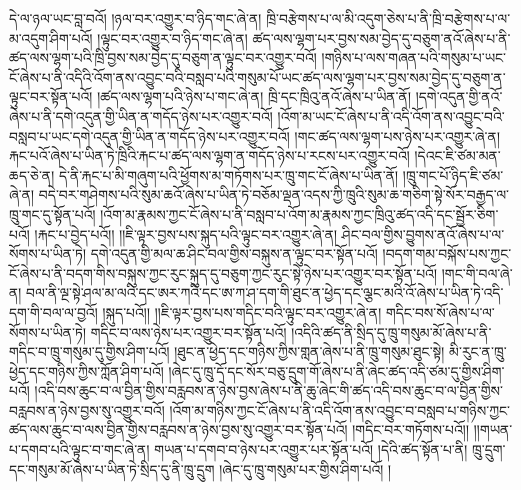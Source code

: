 དེ་ལ་ཉལ་ཡང་བླ་བའོ། །ཉལ་བར་འགྱུར་བ་ཉིད་གང་ཞེ་ན། ཁྲི་བརྩེགས་པ་ལ་མི་འདུག་ཅེས་པ་ནི་ཁྲི་བརྩེགས་པ་ལ་མ་འདུག་ཤིག་པའོ། །ལྟུང་བར་འགྱུར་བ་ཉིད་གང་ཞེ་ན། ཚད་ལས་ལྷག་པར་བྱས་སམ་བྱེད་དུ་བཅུག་ནའོ་ཞེས་པ་ནི་ཚད་ལས་ལྷག་པའི་ཁྲི་བྱས་སམ་བྱེད་དུ་བཅུག་ན་ལྟུང་བར་འགྱུར་བའོ། །གཉིས་པ་ལས་གཞན་པའི་གསུམ་པ་ཡང་ངོ་ཞེས་པ་ནི་འདིའི་འོག་ནས་འབྱུང་བའི་བསླབ་པའི་གསུམ་པོ་ཡང་ཚད་ལས་ལྷག་པར་བྱས་སམ་བྱེད་དུ་བཅུག་ན་ལྟུང་བར་སྟོན་པའོ། །ཚད་ལས་ལྷག་པའི་ཉེས་པ་གང་ཞེ་ན། ཁྲི་དང་ཁྲིའུ་ནའོ་ཞེས་པ་ཡིན་ནོ། །དགེ་འདུན་གྱི་ནའོ་ཞེས་པ་ནི་དགེ་འདུན་གྱི་ཡིན་ན་གདོད་ཉེས་པར་འགྱུར་བའོ། །འོག་མ་ཡང་ངོ་ཞེས་པ་ནི་འདི་འོག་ནས་འབྱུང་བའི་བསླབ་པ་ཡང་དགེ་འདུན་གྱི་ཡིན་ན་གདོད་ཉེས་པར་འགྱུར་བའོ། །གང་ཚད་ལས་ལྷག་པས་ཉེས་པར་འགྱུར་ཞེ་ན། རྐང་པའོ་ཞེས་པ་ཡིན་ཏེ་ཁྲིའི་རྐང་པ་ཚད་ལས་ལྷག་ན་གདོད་ཉེས་པ་རངས་པར་འགྱུར་བའོ། །དེའང་ཇི་ཙམ་མན་ཆད་ཅེ་ན། དེ་ནི་རྐང་པ་མི་གཞུག་པའི་ཕྱོགས་མ་གཏོགས་པར་ཁྲུ་གང་ངོ་ཞེས་པ་ཡིན་ནོ། །ཁྲུ་གང་པོ་ཉིད་ཇི་ཙམ་ཞེ་ན། བདེ་བར་གཤེགས་པའི་སུམ་ཆའོ་ཞེས་པ་ཡིན་ཏེ་བཅོམ་ལྡན་འདས་ཀྱི་ཁྲུའི་སུམ་ཆ་གཅིག་སྟེ་སོར་བརྒྱད་ལ་ཁྲུ་གང་དུ་སྟོན་པའོ། །འོག་མ་རྣམས་ཀྱང་ངོ་ཞེས་པ་ནི་བསླབ་པ་འོག་མ་རྣམས་ཀྱང་ཁྲིའུ་ཚད་འདི་དང་སྦྱོར་ཅིག་པའོ། །རྐང་པ་བྱེད་པའོ།། །།ཇི་ལྟར་བྱས་པས་སྐུད་པའི་ལྟུང་བར་འགྱུར་ཞེ་ན། ཤིང་བལ་གྱིས་བྱུགས་ནའོ་ཞེས་པ་ལ་སོགས་པ་ཡིན་ཏེ། དགེ་འདུན་གྱི་མལ་ཆ་ཤིང་བལ་གྱིས་བསྐུས་ན་ལྟུང་བར་སྟོན་པའོ། །བདག་གམ་བསྐོས་པས་ཀྱང་ངོ་ཞེས་པ་ནི་བདག་གིས་བསྐུས་ཀྱང་རུང་སྐུད་དུ་བཅུག་ཀྱང་རུང་སྟེ་ཉེས་པར་འགྱུར་བར་སྟོན་པའོ། །གང་གི་བལ་ཞེ་ན། བལ་ནི་ལྔ་སྟེ་ཤལ་མ་ལའི་དང་ཨར་ཀའི་དང་ཨ་ཀ་ཤ་དག་གི་ཐུང་ན་ཕྱེད་དང་ལྕང་མའི་འོ་ཞེས་པ་ཡིན་ཏེ་འདི་དག་གི་བལ་ལ་བྱའོ། །སྐུད་པའོ།། །།ཇི་ལྟར་བྱས་པས་གདིང་བའི་ལྟུང་བར་འགྱུར་ཞེ་ན། གདིང་བས་སོ་ཞེས་པ་ལ་སོགས་པ་ཡིན་ཏེ། གདིང་བ་ལས་ཉེས་པར་འགྱུར་བར་སྟོན་པའོ། །འདིའི་ཚད་ནི་སྲིད་དུ་ཁྲུ་གསུམ་མོ་ཞེས་པ་ནི་གདིང་བ་ཁྲུ་གསུམ་དུ་གྱིས་ཤིག་པའོ། །ཐུང་ན་ཕྱེད་དང་གཉིས་ཀྱིས་གླན་ཞེས་པ་ནི་ཁྲུ་གསུམ་ཐུང་སྟེ། མི་རུང་ན་ཁྲུ་ཕྱེད་དང་གཉིས་ཀྱིས་ཀློན་ཤིག་པའོ། །ཞེང་དུ་ཁྲུ་དོ་དང་སོར་བཅུ་དྲུག་གོ་ཞེས་པ་ནི་ཞེང་ཚད་འདི་ཙམ་དུ་གྱིས་ཤིག་པའོ། །འདི་བས་ཆུང་བ་ལ་བྱིན་གྱིས་བརླབས་ན་ཉེས་བྱས་ཞེས་པ་ནི་ཆུ་ཞེང་གི་ཚད་འདི་བས་ཆུང་བ་ལ་བྱིན་གྱིས་བརླབས་ན་ཉེས་བྱས་སུ་འགྱུར་བའོ། །འོག་མ་གཉིས་ཀྱང་ངོ་ཞེས་པ་ནི་འདི་འོག་ནས་འབྱུང་བ་བསླབ་པ་གཉིས་ཀྱང་ཚད་ལས་ཆུང་བ་ལས་བྱིན་གྱིས་བརླབས་ན་ཉེས་བྱས་སུ་འགྱུར་བར་སྟོན་པའོ། །གདིང་བར་གཏོགས་པའོ།། །།གཡན་པ་དགབ་པའི་ལྟུང་བ་གང་ཞེ་ན། གཡན་པ་དགབ་བ་ཉེས་པར་འགྱུར་པར་སྟོན་པའོ། །དེའི་ཚད་སྟོན་པ་ནི། ཁྲུ་དྲུག་དང་གསུམ་མོ་ཞེས་པ་ཡིན་ཏེ་སྲིད་དུ་ནི་ཁྲུ་དྲུག །ཞེང་དུ་ཁྲུ་གསུམ་པར་གྱིས་ཤིག་པའོ། །
